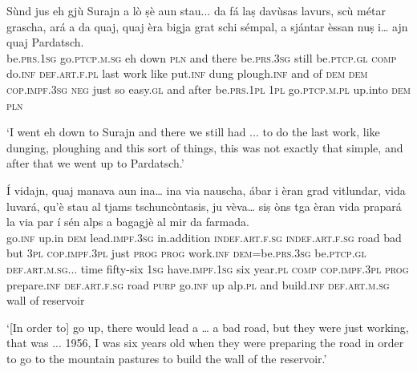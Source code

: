 \begin{linenumbers}
\gll   Sùnd jus eh gjù Surajn a lò ṣè aun stau... da fá laṣ davùsas lavurs, scù métar grascha, ará a da quaj, quaj èra bigja grat schi sémpal, a sjántar èssan nuṣ i… ajn quaj Pardatsch. \\
 be.\textsc{prs.1sg} go.\textsc{ptcp.m.sg} eh down \textsc{pln} and there be.\textsc{prs.3sg}  still be.\textsc{ptcp.gl} \textsc{comp} do.\textsc{inf} \textsc{def.art.f.pl} last work like put.\textsc{inf} dung  plough.\textsc{inf} and of  \textsc{dem}  \textsc{dem}  \textsc{cop.impf.3sg}  \textsc{neg} just so easy.\textsc{gl} and after be.\textsc{prs.1pl}  \textsc{1pl} go.\textsc{ptcp.m.pl} up.into  \textsc{dem}  \textsc{pln}   \\
\end{linenumbers}
\medskip
\glt `I went eh down to Surajn and there we still had ... to do the last work, like dunging, ploughing and this sort of things, this was not exactly that simple, and after that we went up to Pardatsch.'
\medskip

\begin{linenumbers}
\gll Í vidajn, quaj manava aun ina… ina via nauscha, ábar i èran grad vitlundar, vida luvará, qu’è stau al tjams tschuncòntasis, ju vèva… siṣ òns tga èran vida prapará la via par í sén alps a bagagjè al mir da farmada.   \\
 go.\textsc{inf} up.in \textsc{dem} lead.\textsc{impf.3sg} in.addition  \textsc{indef.art.f.sg} \textsc{indef.art.f.sg} road bad but \textsc{3pl} \textsc{cop.impf.3pl} just  \textsc{prog} \textsc{prog} work.\textsc{inf} \textsc{dem}=be.\textsc{prs.3sg} be.\textsc{ptcp.gl} \textsc{def.art.m.sg}... time fifty-six \textsc{1sg} have.\textsc{impf.1sg} six year.\textsc{pl} \textsc{comp} \textsc{cop.impf.3pl} \textsc{prog} prepare.\textsc{inf} \textsc{def.art.f.sg} road \textsc{purp} go.\textsc{inf} up alp.\textsc{pl} and build.\textsc{inf} \textsc{def.art.m.sg} wall of  reservoir \\ 
\end{linenumbers} 
\medskip
\glt `[In order to] go up, there would lead a … a bad road, but they were just working, that was ... 1956, I was six years old when they were preparing the road in order to go to the mountain pastures to build the wall of the reservoir.'
\medskip

